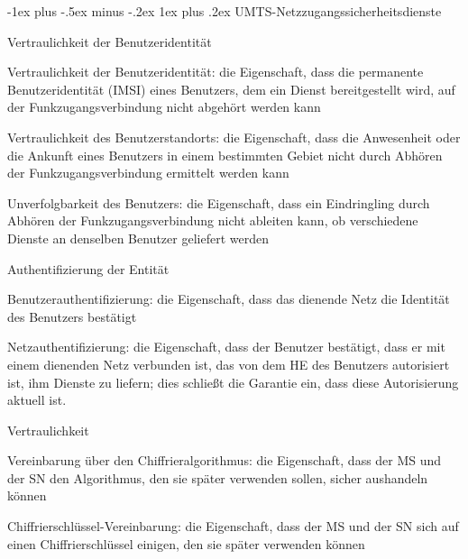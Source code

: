 \documentclass[a4paper]{article}
\makeatletter
\renewcommand{\subsubsection}{\@startsection{subsubsection}{3}{0mm}%
 {-1ex plus -.5ex minus -.2ex}%
 {1ex plus .2ex}%
 {\normalfont\small\bfseries}}
\makeatother
\begin{document}
\begin{multicols}{3}
      \subsubsection{UMTS-Netzzugangssicherheitsdienste}
      \begin{itemize*}
            \item Vertraulichkeit der Benutzeridentität
            \begin{itemize*}
                  \item Vertraulichkeit der Benutzeridentität: die Eigenschaft, dass die permanente Benutzeridentität (IMSI) eines Benutzers, dem ein Dienst bereitgestellt wird, auf der Funkzugangsverbindung nicht abgehört werden kann
                  \item Vertraulichkeit des Benutzerstandorts: die Eigenschaft, dass die Anwesenheit oder die Ankunft eines Benutzers in einem bestimmten Gebiet nicht durch Abhören der Funkzugangsverbindung ermittelt werden kann
                  \item Unverfolgbarkeit des Benutzers: die Eigenschaft, dass ein Eindringling durch Abhören der Funkzugangsverbindung nicht ableiten kann, ob verschiedene Dienste an denselben Benutzer geliefert werden
            \end{itemize*}
            \item Authentifizierung der Entität
            \begin{itemize*}
                  \item Benutzerauthentifizierung: die Eigenschaft, dass das dienende Netz die Identität des Benutzers bestätigt
                  \item Netzauthentifizierung: die Eigenschaft, dass der Benutzer bestätigt, dass er mit einem dienenden Netz verbunden ist, das von dem HE des Benutzers autorisiert ist, ihm Dienste zu liefern; dies schließt die Garantie ein, dass diese Autorisierung aktuell ist.
            \end{itemize*}
            \item Vertraulichkeit
            \begin{itemize*}
                  \item Vereinbarung über den Chiffrieralgorithmus: die Eigenschaft, dass der MS und der SN den Algorithmus, den sie später verwenden sollen, sicher aushandeln können
                  \item Chiffrierschlüssel-Vereinbarung: die Eigenschaft, dass der MS und der SN sich auf einen Chiffrierschlüssel einigen, den sie später verwenden können

\end{itemize*}
\end{itemize*}
\end{multicols}
\end{document}
